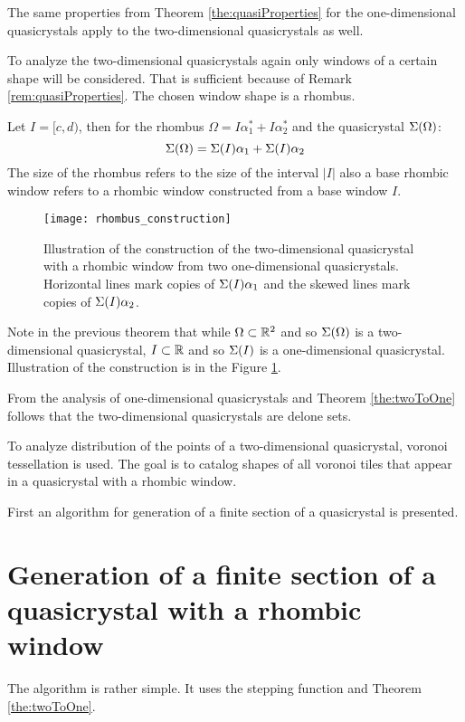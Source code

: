 \documentclass[text.tex]{subfiles}
\begin{document}
\begin{remark}
\label{rem:quasiProperties}
The same properties from Theorem \ref{the:quasiProperties} for the one-dimensional quasicrystals apply to the two-dimensional quasicrystals as well.
\end{remark}

To analyze the two-dimensional quasicrystals again only windows of a certain shape will be considered. That is sufficient because of Remark \ref{rem:quasiProperties}. The chosen window shape is a rhombus. 

\begin{theorem}
\label{the:twoToOne}
Let $I = [c,d)$, then for the rhombus $\Omega = I\alpha_1^\ast + I\alpha_2^\ast$ and the quasicrystal $\Sigma(\Omega)$: 
$$\Sigma(\Omega) = \Sigma(I)\alpha_1 + \Sigma(I)\alpha_2$$
The size of the rhombus refers to the size of the interval $|I|$ also a base rhombic window refers to a rhombic window constructed from a base window $I$.
\end{theorem}

\begin{figure}[h]
\centering
\texttt{[image: rhombus\_construction]}
\caption{Illustration of the construction of the two-dimensional quasicrystal with a rhombic window from two one-dimensional quasicrystals. Horizontal lines mark copies of $\Sigma(I)\alpha_1$ and the skewed lines mark copies of $\Sigma(I)\alpha_2$.}
\label{fig:quasiRhombusConstruction}
\end{figure}

\begin{remark}
Note in the previous theorem that while $\Omega \subset \mathbb{R}^2$ and so $\Sigma(\Omega)$ is a two-dimensional quasicrystal, $I \subset \mathbb{R}$ and so $\Sigma(I)$ is a one-dimensional quasicrystal. Illustration of the construction is in the Figure \ref{fig:quasiRhombusConstruction}.
\end{remark}

From the analysis of one-dimensional quasicrystals and Theorem \ref{the:twoToOne} follows that the two-dimensional quasicrystals are delone sets.  

To analyze distribution of the points of a two-dimensional quasicrystal, voronoi tessellation is used. The goal is to catalog shapes of all voronoi tiles that appear in a quasicrystal with a rhombic window. 

First an algorithm for generation of a finite section of a quasicrystal is presented. 

%
\clearpage
\section{Generation of a finite section of a quasicrystal with a rhombic window}%
The algorithm is rather simple. It uses the stepping function and Theorem \ref{the:twoToOne}. 
\end{document}
